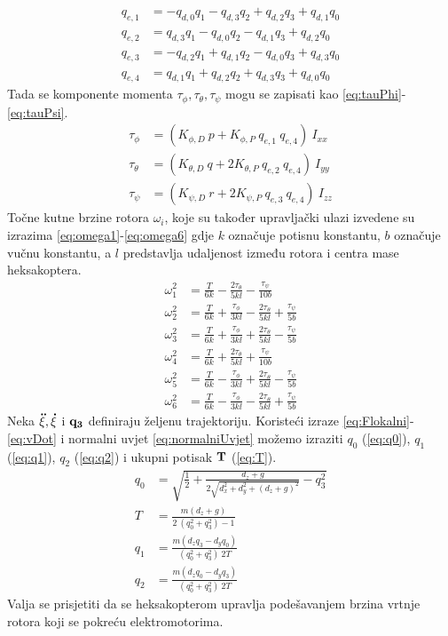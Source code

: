 \documentclass[times, utf8, diplomski]{fer}
\begin{document}
\begin{align}
q_{e,1} &= -q_{d,0}q_1 -q_{d,3}q_2 + q_{d,2}q_3 + q_{d,1}q_0 \label{eq:PIDqe1} \\
q_{e,2} &= q_{d,3}q_1 -q_{d,0}q_2 - q_{d,1}q_3 + q_{d,2}q_0 \label{eq:PIDqe2} \\
q_{e,3} &= -q_{d,2}q_1 +q_{d,1}q_2 - q_{d,0}q_3 + q_{d,3}q_0 \label{eq:PIDqe3} \\
q_{e,4} &= q_{d,1}q_1 +q_{d,2}q_2 + q_{d,3}q_3 + q_{d,0}q_0 \label{eq:PIDqe4}
\end{align}
Tada se komponente momenta $\tau_{\phi}, \tau_{\theta},\tau_{\psi}$ mogu se zapisati kao \ref{eq:tauPhi}-\ref{eq:tauPsi}.
\begin{align}
\tau_{\phi} &= (K_{\phi,D}~p + K_{\phi,P}~q_{e,1}~q_{e,4})~I_{xx} \label{eq:tauPhi} \\
\tau_{\theta} &= (K_{\theta,D}~q + 2K_{\theta,P}~q_{e,2}~q_{e,4})~I_{yy} \label{eq:tauTheta} \\
\tau_{\psi} &= (K_{\psi,D}~r + 2K_{\psi,P}~q_{e,3}~q_{e,4})~I_{zz} \label{eq:tauPsi}
\end{align}
Točne kutne brzine rotora $\omega_i$, koje su također upravljački ulazi izvedene su izrazima \ref{eq:omega1}-\ref{eq:omega6} gdje $k$ označuje potisnu konstantu, $b$ označuje vučnu konstantu, a $l$ predstavlja udaljenost između rotora i centra mase heksakoptera.
\begin{align}
\omega^2_1 &= \frac{T}{6k} - \frac{2\tau_{\theta}}{5kl} - \frac{\tau_{\psi}}{10b} \label{eq:omega1} \\
\omega^2_2 &= \frac{T}{6k} + \frac{\tau_{\phi}}{3kl} -\frac{2\tau_{\theta}}{5kl} + \frac{\tau_{\psi}}{5b} \label{eq:omega2} \\
\omega^2_3 &= \frac{T}{6k} + \frac{\tau_{\phi}}{3kl} + \frac{2\tau_{\theta}}{5kl} - \frac{\tau_{\psi}}{5b} \label{eq:omega3} \\
\omega^2_4 &= \frac{T}{6k} + \frac{2\tau_{\theta}}{5kl} + \frac{\tau_{\psi}}{10b} \label{eq:omega4} \\
\omega^2_5 &= \frac{T}{6k} - \frac{\tau_{\phi}}{3kl} + \frac{2\tau_{\theta}}{5kl} - \frac{\tau_{\psi}}{5b} \label{eq:omega5} \\
\omega^2_6 &= \frac{T}{6k} - \frac{\tau_{\phi}}{3kl} -\frac{2\tau_{\theta}}{5kl} + \frac{\tau_{\psi}}{5b} \label{eq:omega6} 
\end{align}
Neka $\bf \ddot{\xi}, \dot{\xi}$ i $\bf q_3$ definiraju željenu trajektoriju. Koristeći izraze \ref{eq:Flokalni}-\ref{eq:vDot} i normalni uvjet \ref{eq:normalniUvjet} možemo izraziti $q_0$ (\ref{eq:q0}), $q_1$ (\ref{eq:q1}), $q_2$ (\ref{eq:q2}) i ukupni potisak $\bf T$ (\ref{eq:T}). 
\begin{align}
q_0 &= \sqrt{\frac{1}{2} + \frac{d_z+g}{2\sqrt{d^2_x+d^2_y+(d_z+g)^2}}-q^2_3} \label{eq:q0} \\
T &= \frac{m(d_z + g)}{2~(q^2_0 + q^2_3)-1} \label{eq:T} \\
q_1 &= \frac{m(d_z q_3 - d_y q_0)}{(q^2_0 + q^2_3)~2T} \label{eq:q1} \\
q_2 &= \frac{m(d_z q_0 - d_y q_3)}{(q^2_0 + q^2_3)~2T} \label{eq:q2}
\end{align}
Valja se prisjetiti da se heksakopterom upravlja podešavanjem brzina vrtnje rotora koji se pokreću elektromotorima. 
\end{document}
